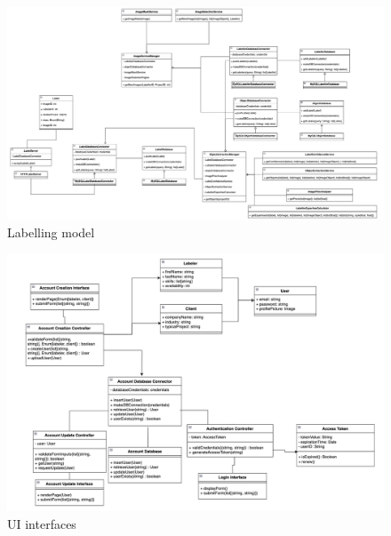 \documentclass[12pt, titlepage]{article}
\begin{document}
    \begin{figure}[H]
    \centering
    \includegraphics[width=1\textwidth]{labelling_model.png}
    \caption{Labelling model}
    \label{FigUH}
    \end{figure}

    \begin{figure}[H]
    \centering
    \includegraphics[width=1\textwidth]{ui_interfaces.png}
    \caption{UI interfaces}
    \label{FigUH}
    \end{figure}

\end{document}
